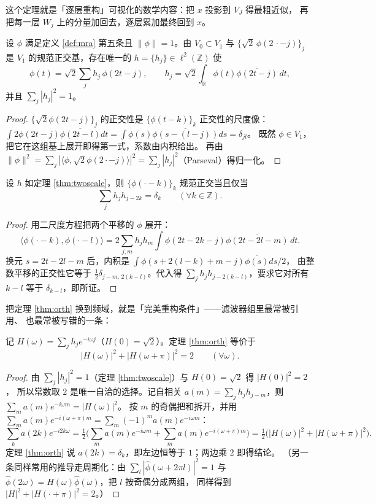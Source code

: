这个定理就是「逐层重构」可视化的数学内容：把 $x$ 投影到 $V_J$ 得最粗近似，
再把每一层 $W_j$ 上的分量加回去，逐层累加最终回到 $x$。

\begin{theorem}[二尺度方程]
\label{thm:twoscale}
设 $\phi$ 满足定义 \ref{def:mra} 第五条且 $\|\phi\|=1$。由 $V_0\subset V_1$ 与
$\{\sqrt2\,\phi(2\,\cdot-j)\}_j$ 是 $V_1$ 的规范正交基，存在唯一的
$h=\{h_j\}\in\ell^2(\mathbb{Z})$ 使
\[
\phi(t)=\sqrt2\sum_j h_j\,\phi(2t-j),\qquad h_j=\sqrt2\int_{\mathbb{R}}\phi(t)\overline{\phi(2t-j)}\,dt ,
\]
并且 $\sum_j|h_j|^2=1$。
\end{theorem}

\begin{proof}
$\{\sqrt2\phi(2t-j)\}_j$ 的正交性是 $\{\phi(t-k)\}_k$ 正交性的尺度像：
$\int 2\phi(2t-j)\overline{\phi(2t-l)}dt=\int\phi(s)\overline{\phi(s-(l-j))}ds=\delta_{jl}$。
既然 $\phi\in V_1$，把它在这组基上展开即得第一式，系数由内积给出。
再由 $\|\phi\|^2=\sum_j|\langle\phi,\sqrt2\phi(2\cdot-j)\rangle|^2=\sum_j|h_j|^2$（Parseval）得归一化。
\end{proof}

\begin{theorem}[正交性条件]
\label{thm:orth}
设 $h$ 如定理 \ref{thm:twoscale}，则 $\{\phi(\cdot-k)\}_k$ 规范正交当且仅当
\[
\sum_j h_j h_{j-2k}=\delta_k\qquad(\forall k\in\mathbb{Z}).
\]
\end{theorem}

\begin{proof}
用二尺度方程把两个平移的 $\phi$ 展开：
\[
\langle\phi(\cdot-k),\phi(\cdot-l)\rangle
=2\sum_{j,m}h_jh_m\int\phi(2t-2k-j)\overline{\phi(2t-2l-m)}\,dt .
\]
换元 $s=2t-2l-m$ 后，内积是 $\int\phi(s+2(l-k)+m-j)\overline{\phi(s)}ds/2$，
由整数平移的正交性它等于 $\tfrac12\delta_{j-m,\,2(k-l)}$。代入得
$\sum_{j}h_jh_{j-2(k-l)}$，要求它对所有 $k-l$ 等于 $\delta_{k-l}$，即所证。
\end{proof}

把定理 \ref{thm:orth} 换到频域，就是「完美重构条件」——滤波器组里最常被引用、
也最常被写错的一条：

\begin{theorem}
\label{thm:pr}
记 $H(\omega)=\sum_j h_j e^{-i\omega j}$（$H(0)=\sqrt2$）。定理 \ref{thm:orth} 等价于
\[
|H(\omega)|^2+|H(\omega+\pi)|^2=2\qquad(\forall\omega).
\]
\end{theorem}

\begin{proof}
由 $\sum_j|h_j|^2=1$（定理 \ref{thm:twoscale}）与 $H(0)=\sqrt2$ 得 $|H(0)|^2=2$，
所以常数取 $2$ 是唯一自洽的选择。记自相关
$a(m)=\sum_jh_jh_{j-m}$，则 $\sum_ma(m)e^{-i\omega m}=|H(\omega)|^2$。
按 $m$ 的奇偶把和拆开，并用
$\sum_{m}a(m)e^{-i(\omega+\pi)m}=\sum_m(-1)^ma(m)e^{-i\omega m}$：
\[
\sum_k a(2k)e^{-i2k\omega}=\tfrac12\Big(\sum_ma(m)e^{-i\omega m}+\sum_ma(m)e^{-i(\omega+\pi)m}\Big)
=\tfrac12\big(|H(\omega)|^2+|H(\omega+\pi)|^2\big).
\]
定理 \ref{thm:orth} 说 $a(2k)=\delta_k$，即左边恒等于 $1$；两边乘 $2$ 即得结论。
（另一条同样常用的推导走周期化：由 $\sum_l|\hat\phi(\omega+2\pi l)|^2=1$
与 $\hat\phi(2\omega)=H(\omega)\hat\phi(\omega)$，把 $l$ 按奇偶分成两组，
同样得到 $|H|^2+|H(\cdot+\pi)|^2=2$。）
\end{proof}

